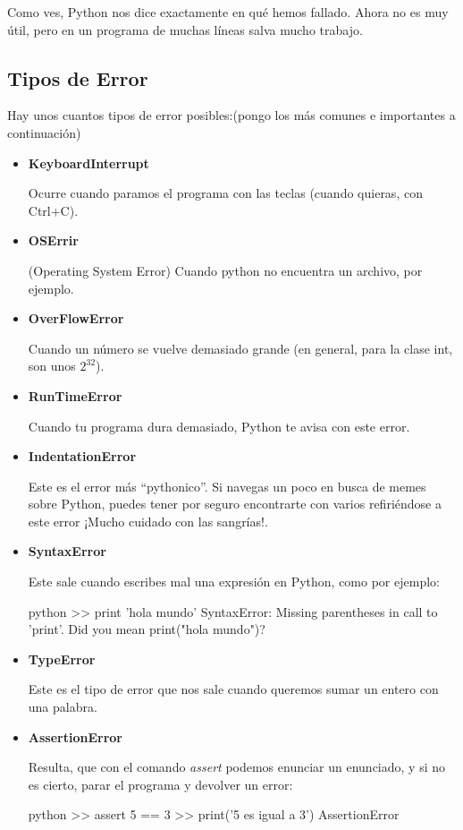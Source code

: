 \documentclass{article}
\begin{document}
Como ves, Python nos dice exactamente en qué hemos fallado. Ahora no es muy útil, pero en un programa de muchas líneas salva mucho trabajo.


\subsection{Tipos de Error}
Hay unos cuantos tipos de error posibles:(pongo los más comunes e importantes a continuación)
\begin{itemize}
    \item \textbf{KeyboardInterrupt}
    
    Ocurre cuando paramos el programa con las teclas (cuando quieras, con Ctrl+C).
    
    \item \textbf{OSErrir}
    
    (Operating System Error) Cuando python no encuentra un archivo, por ejemplo.
    
    \item \textbf{OverFlowError}
    
    Cuando un número se vuelve demasiado grande (en general, para la clase int, son unos $2^32$).
    
    \item \textbf{RunTimeError}
    
    Cuando tu programa dura demasiado, Python te avisa con este error.
    
    \item \textbf{IndentationError}
    
    Este es el error más ``pythonico''. Si navegas un poco en busca de memes sobre Python, puedes tener por seguro encontrarte con varios refiriéndose a este error ¡Mucho cuidado con las sangrías!.
    

    \item \textbf{SyntaxError} 
    
    Este sale cuando escribes mal una expresión en Python, como por ejemplo:
    \begin{mintedbox}{python}
        >> print 'hola mundo'
        SyntaxError: Missing parentheses in call to 'print'. Did you mean print("hola mundo")? 
    \end{mintedbox}
    
    \item \textbf{TypeError} 
    
    Este es el tipo de error que nos sale cuando queremos sumar un entero con una palabra.
    
    \item \textbf{AssertionError}
    
    Resulta, que con el comando \textit{assert} podemos enunciar un enunciado, y si no es cierto, parar el programa y devolver un error:
    \begin{mintedbox}{python}
>> assert 5 == 3
>> print('5 es igual a 3')
AssertionError
    \end{mintedbox}
\end{itemize}
\end{document}
